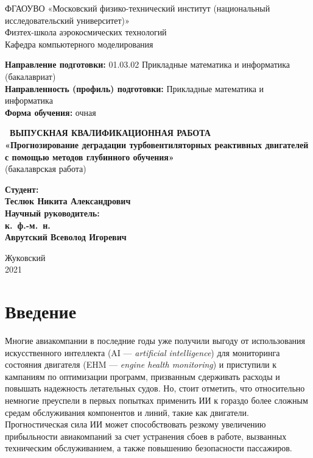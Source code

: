 \documentclass[14pt]{extarticle}
\begin{document}
\thispagestyle{empty}
\begin{center}
	\linespread{1.3}
    \sc
        ФГАОУВО «Московский физико-технический институт \rm{(национальный исследовательский университет)}»\\
        Физтех-школа аэрокосмических технологий\\
        Кафедра компьютерного моделирования\\[10mm]
    \begin{flushleft}
  \textbf{Направление подготовки:} 01.03.02 Прикладные математика и информатика (бакалавриат) \\
  \textbf{Направленность (профиль) подготовки:} Прикладные математика и информатика \\
  \textbf{Форма обучения:} очная\\[10mm]
  
    \end{flushleft}
    
    {\bf\
		ВЫПУСКНАЯ КВАЛИФИКАЦИОННАЯ РАБОТА \\ «Прогнозирование деградации турбовентиляторных реактивных двигателей с помощью методов глубинного обучения» }\\
		(бакалаврская работа)\\[10mm]
    
\end{center}
		

\hfill\parbox{80mm}{
	\linespread{1.3}
    \begin{flushleft}
    \bf
        Студент:\\
    \rm
        Теслюк Никита Александрович \\[1cm]
    \bf
        Научный руководитель:\\
    \rm
        к.~ф.-м.~н. \\ Аврутский Всеволод Игоревич \\[16mm]
    \end{flushleft}
}
\begin{center}
    Жуковский\\
    2021
\end{center}


\newpage
\linespread{1}
\tableofcontents

\newpage

\section{Введение}
\label{sec:intro}

Многие авиакомпании в последние годы уже получили выгоду от использования искусственного интеллекта (AI --- {\it artificial intelligence}) для мониторинга состояния двигателя (EHM --- {\it engine health monitoring}) и приступили к кампаниям по оптимизации программ, призванным сдерживать расходы и повышать надежность летательных судов. Но, стоит отметить, что относительно немногие преуспели в первых попытках применить ИИ к гораздо более сложным средам обслуживания компонентов и линий, такие как двигатели. Прогностическая сила ИИ может способствовать резкому увеличению прибыльности авиакомпаний за счет устранения сбоев в работе, вызванных техническим обслуживанием, а также повышению безопасности пассажиров.
\end{document}

